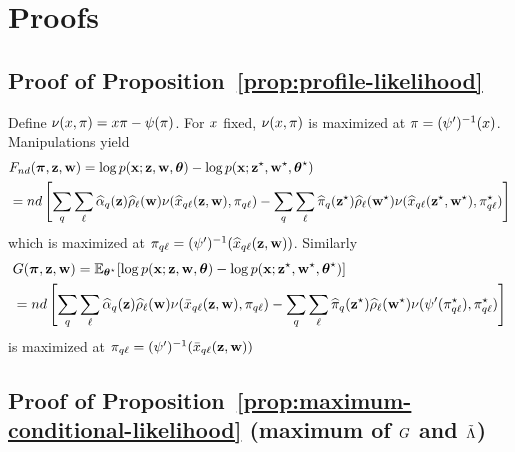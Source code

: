 \section{Proofs}
\label{sec:proofPL}



\subsection{Proof of Proposition~\ref{prop:profile-likelihood}} 
\proofbegin
Define
    $\nu(x, \pi)  = x \pi - \psi (\pi)$. For $x$ fixed, $\nu(x, \pi)$ is maximized at $\pi = (\psi')^{-1}(x)$. Manipulations yield
\begin{align*}
  &\Fnd(\bal, \bz, \bw)= \log \prob(\bx; \bz,\bw,\btheta) - \log {\prob(\bx; \bzs,\bws,\bthetas)} \\
  & = \n\dd \left[ \sum_{\kk} \sum_{\el} \pizk \rhowl \nu(\hxklzw, \alkl)  - \sum_{\kk} \sum_{\el} \pizsk \rhowsl \nu(\hxkl(\bzs, \bws), \alskl) \right]
\end{align*}
which is maximized at $\pi_{q\ell} = (\psi')^{-1}(\widehat{x}_{q\ell}(\mathbf{z}, \mathbf{w}))$. Similarly
\begin{align*}
 & \G(\bal, \bz, \bw)  = \Esp_{\bthetas} [ \log \prob(\bx; \bz,\bw,\btheta) - \log \prob(\bx; \bzs,\bws,\bthetas) ] \\
  & = \n\dd \left[ \sum_{\kk} \sum_{\el} \pizk \rhowl \nu(\barxklzw, \alkl)  - \sum_{\kk} \sum_{\el} \pizsk \rhowsl \nu(\normp(\alskl), \alskl) \right]
\end{align*}
is maximized at $\pi_{q\ell} = (\psi')^{-1}(\bar{x}_{q\ell}(\mathbf{z}, \mathbf{w}))$
\proofend

\subsection{Proof of Proposition~\ref{prop:maximum-conditional-likelihood}  (maximum of $G$ and $\tilde{\Lambda}$)} 

